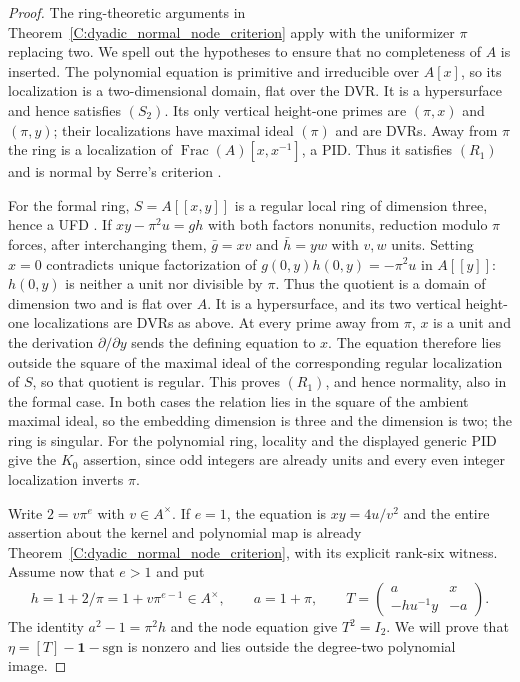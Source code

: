 \begin{proof}
The ring-theoretic arguments in
Theorem~\ref{C:dyadic_normal_node_criterion} apply with the
uniformizer $\pi$ replacing two. We spell out the hypotheses
to ensure that no completeness of $A$ is inserted.
The polynomial equation is primitive and irreducible over
$A[x]$, so its localization is a two-dimensional domain,
flat over the DVR. It is a hypersurface and hence satisfies
$(S_2)$. Its only vertical height-one primes are $(\pi,x)$
and $(\pi,y)$; their localizations have maximal ideal $(\pi)$
and are DVRs. Away from $\pi$ the ring is a localization of
$\operatorname{Frac}(A)[x,x^{-1}]$, a PID. Thus it satisfies
$(R_1)$ and is normal by Serre's criterion
\cite[Lemma 10.157.4, Tag 031S]{C-NormalKernelStacks}.

For the formal ring, $S=A[[x,y]]$ is a regular local ring
of dimension three, hence a UFD
\cite[Lemma 15.123.2, Tag 0AG0]{C-NormalNodesStacks}.
If $xy-\pi^2u=gh$ with both factors nonunits, reduction
modulo $\pi$ forces, after interchanging them,
$\bar g=xv$ and $\bar h=yw$ with $v,w$ units.
Setting $x=0$ contradicts unique factorization of
$g(0,y)h(0,y)=-\pi^2u$ in $A[[y]]$: $h(0,y)$ is
neither a unit nor divisible by $\pi$.
Thus the quotient is a domain of dimension two and is flat
over $A$. It is a hypersurface, and its two vertical
height-one localizations are DVRs as above.
At every prime away from $\pi$, $x$ is a unit and the
derivation $\partial/\partial y$ sends the defining equation
to $x$. The equation therefore lies outside the square of
the maximal ideal of the corresponding regular localization
of $S$, so that quotient is regular. This proves $(R_1)$,
and hence normality, also in the formal case.
In both cases the relation lies in the square of the
ambient maximal ideal, so the embedding dimension is three
and the dimension is two; the ring is singular.
For the polynomial ring, locality and the displayed generic
PID give the $K_0$ assertion, since odd integers are already
units and every even integer localization inverts $\pi$.

Write $2=v\pi^e$ with $v\in A^\times$.
If $e=1$, the equation is $xy=4u/v^2$ and the entire
assertion about the kernel and polynomial map is already
Theorem~\ref{C:dyadic_normal_node_criterion}, with its
explicit rank-six witness. Assume now that $e>1$ and put
\[
 h=1+2/\pi=1+v\pi^{e-1}\in A^\times,
 \qquad a=1+\pi,\qquad
 T=\begin{pmatrix}a&x\\-h u^{-1}y&-a\end{pmatrix}.
                                                               \tag{C.1.RN3}
\]
The identity $a^2-1=\pi^2h$ and the node equation give
$T^2=I_2$. We will prove that
$\eta=[T]-\mathbf1-\mathrm{sgn}$ is nonzero and lies
outside the degree-two polynomial image.


\end{proof}
